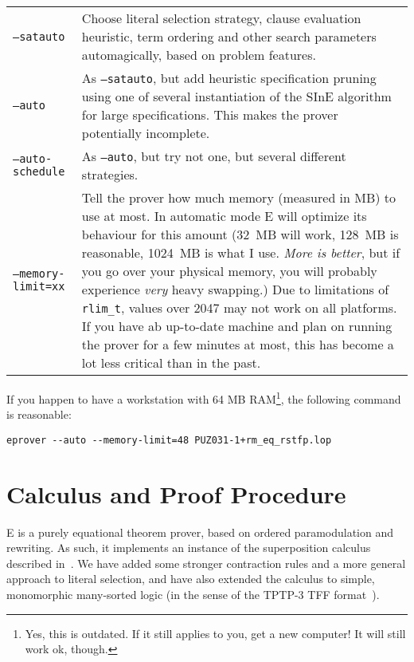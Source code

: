 \documentclass{report}
\begin{document}
\bigskip
\noindent
\begin{tabular}{lp{7.5cm}}
  \texttt{--satauto}
  & Choose literal selection strategy,  clause
    evaluation heuristic, term ordering and other search parameters
    automagically\index{xyzzy}, based on problem features.\\
  \texttt{--auto}
  & As \texttt{--satauto}, but add heuristic
    specification pruning using one of several instantiation of the SInE
    algorithm~\cite{HV:CADE-2011} for large specifications. This makes
    the prover potentially incomplete.\\
  \texttt{--auto-schedule}
  & As \texttt{--auto}, but try not one, but
    several different strategies. \\
  \texttt{--memory-limit=xx}
  & Tell the prover how much memory
    (measured in MB) to use at most. In automatic mode E will optimize
    its behaviour for this amount (32~MB will work, 128~MB is
    reasonable, 1024~MB is what I use. \emph{More is
    better}\footnotemark, but if you go over
    your physical memory, you will probably experience \emph{very} heavy
    swapping.) Due to limitations of \texttt{rlim\_t}, values over 2047
    may not work on all platforms. If you have ab up-to-date machine
    and plan on running the prover for a few minutes at most, this has
    become a lot less critical than in the past.\\
\end{tabular}

\begin{example}
  If you happen to have a workstation with 64 MB RAM\footnote{Yes,
    this is outdated. If it still applies to you, get a new
    computer! It will still work ok, though.}, the following command
  is reasonable:\nopagebreak
\small\nopagebreak
\begin{verbatim}
eprover --auto --memory-limit=48 PUZ031-1+rm_eq_rstfp.lop
\end{verbatim}
  \normalsize
\end{example}



\chapter{Calculus and Proof Procedure}
\label{sec:calculus}

E is a purely equational theorem prover, based on ordered
paramodulation and rewriting. As such, it implements an instance of
the superposition calculus described in~\cite{BG94}. We have added
some stronger contraction rules and a more general approach to literal
selection, and have also extended the calculus to simple, monomorphic
many-sorted logic (in the sense of the TPTP-3 TFF
format~\cite{SSCB:LPAR-2012}).
\end{document}
